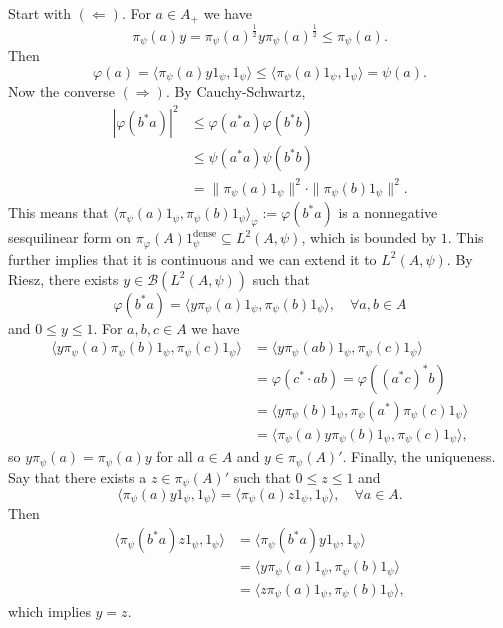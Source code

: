 \begin{myproof}
  Start with $(\Leftarrow)$. For $a \in A_+$ we have 
  $$\pi_{\psi} (a) y = \pi_{\psi} (a)^{\frac{1}{2}} y \pi_{\psi} (a) ^{\frac{1}{2}} \leq \pi_{\psi} (a).$$
  Then 
  $$\varphi(a) = \langle \pi_{\psi} (a) y 1_{\psi}, 1_{\psi} \rangle \leq \langle \pi_{\psi} (a) 1_{\psi}, 1_{\psi}\rangle = \psi(a).$$
  Now the converse $(\Rightarrow)$. By Cauchy-Schwartz,
  \begin{align*}
    |\varphi (b^* a)|^2 &\leq \varphi(a^* a) \varphi(b^* b)\\
    &\leq \psi (a^* a) \psi (b^* b)\\
    &= \| \pi_{\psi} (a) 1_{\psi} \|^2 \cdot \| \pi_{\psi} (b) 1_{\psi} \|^2.
  \end{align*}
  This means that $\langle \pi_{\psi} (a) 1_{\psi}, \pi_{\psi} (b) 1_{\psi}\rangle_{\varphi} := \varphi (b^* a)$ is a nonnegative sesquilinear form on 
  $\pi_{\varphi} (A) 1_{\psi}^{\mathrm{dense}} \subseteq L^2 (A, \psi)$, which is bounded by $1$.
  This further implies that it is continuous and we can extend it to $L^2 (A, \psi)$.
  By Riesz, there exists $y \in \mathcal{B} (L^2 (A, \psi))$ such that 
  $$\varphi(b^* a) = \langle y \pi_{\psi} (a) 1_{\psi} , \pi_{\psi} (b) 1_{\psi} \rangle,\quad \forall a, b \in A$$
  and $0 \leq y \leq 1$. For $a, b, c \in A$ we have 
  \begin{align*}
    \langle y \pi_{\psi} (a) \pi_{\psi} (b) 1_{\psi}, \pi_{\psi} (c) 1_{\psi}\rangle &= \langle y \pi_{\psi} (ab) 1_{\psi}, \pi_{\psi} (c) 1_{\psi} \rangle\\
    &= \varphi(c^* \cdot ab) = \varphi ((a^* c)^* b)\\
    &= \langle y \pi_{\psi} (b) 1_{\psi}, \pi_{\psi} (a^*) \pi_{\psi} (c) 1_{\psi}\rangle\\
    &= \langle \pi_{\psi} (a) y \pi_{\psi} (b) 1_{\psi}, \pi_{\psi} (c) 1_{\psi}\rangle,
  \end{align*}
  so $y \pi_{\psi} (a) = \pi_{\psi} (a) y$ for all $a \in A$ and $y \in \pi_{\psi} (A) '$.
  Finally, the uniqueness. Say that there exists a $z \in \pi_{\psi} (A)'$ such that $0 \leq z \leq 1$ and 
  $$\langle \pi_{\psi} (a) y 1_{\psi}, 1_{\psi} \rangle = \langle \pi_{\psi} (a) z 1_{\psi}, 1_{\psi} \rangle,\quad \forall a \in A.$$
  Then 
  \begin{align*}
    \langle \pi_{\psi} (b^* a) z 1_{\psi}, 1_{\psi} \rangle &= \langle \pi_{\psi} (b^* a) y 1_{\psi}, 1_{\psi} \rangle \\
    &= \langle y \pi_{\psi} (a) 1_{\psi}, \pi_{\psi} (b) 1_{\psi} \rangle\\
    &= \langle z \pi_{\psi} (a) 1_{\psi}, \pi_{\psi} (b) 1_{\psi} \rangle,  
  \end{align*}
  which implies $y = z$.
\end{myproof}

